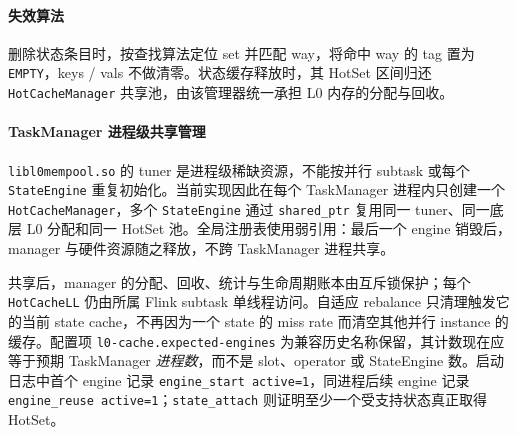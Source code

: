 \documentclass[a4paper,11pt]{article}
\begin{document}
\paragraph{失效算法}
删除状态条目时，按查找算法定位 set 并匹配 way，将命中 way 的 tag 置为 \texttt{EMPTY}，keys / vals 不做清零。状态缓存释放时，其 HotSet 区间归还 \texttt{HotCacheManager} 共享池，由该管理器统一承担 L0 内存的分配与回收。

\paragraph{TaskManager 进程级共享管理}
\texttt{libl0mempool.so} 的 tuner 是进程级稀缺资源，不能按并行 subtask 或每个 \texttt{StateEngine} 重复初始化。当前实现因此在每个 TaskManager 进程内只创建一个 \texttt{HotCacheManager}，多个 \texttt{StateEngine} 通过 \texttt{shared\_ptr} 复用同一 tuner、同一底层 L0 分配和同一 HotSet 池。全局注册表使用弱引用：最后一个 engine 销毁后，manager 与硬件资源随之释放，不跨 TaskManager 进程共享。

共享后，manager 的分配、回收、统计与生命周期账本由互斥锁保护；每个 \texttt{HotCacheLL} 仍由所属 Flink subtask 单线程访问。自适应 rebalance 只清理触发它的当前 state cache，不再因为一个 state 的 miss rate 而清空其他并行 instance 的缓存。配置项 \texttt{l0-cache.expected-engines} 为兼容历史名称保留，其计数现在应等于预期 TaskManager \emph{进程数}，而不是 slot、operator 或 StateEngine 数。启动日志中首个 engine 记录 \texttt{engine\_start active=1}，同进程后续 engine 记录 \texttt{engine\_reuse active=1}；\texttt{state\_attach} 则证明至少一个受支持状态真正取得 HotSet。
\end{document}
